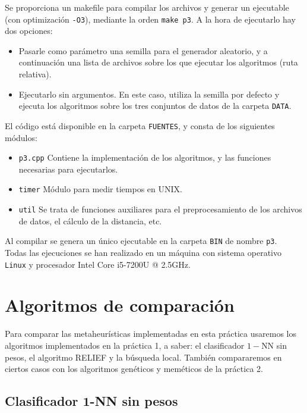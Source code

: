 \documentclass[12pt]{article}
\begin{document}
Se proporciona un makefile para compilar los archivos y generar un ejecutable (con optimización \verb|-O3|), mediante la orden \verb|make p3|. A la hora de ejecutarlo hay dos opciones:

\begin{itemize}
    \item Pasarle como parámetro una semilla para el generador aleatorio, y a continuación una lista de archivos sobre los que ejecutar los algoritmos (ruta relativa).
    \item Ejecutarlo sin argumentos. En este caso, utiliza la semilla por defecto y ejecuta los algoritmos sobre los tres conjuntos de datos de la carpeta \verb|DATA|.
\end{itemize}

El código está disponible en la carpeta \verb|FUENTES|, y consta de los siguientes módulos:

\begin{itemize}
	\item \verb|p3.cpp| Contiene la implementación de los algoritmos, y las funciones necesarias para ejecutarlos.
	\item \verb|timer| Módulo para medir tiempos en UNIX.
	\item \verb|util| Se trata de funciones auxiliares para el preprocesamiento de los archivos de datos, el cálculo de la distancia, etc.
\end{itemize}

Al compilar se genera un único ejecutable en la carpeta \verb|BIN| de nombre \verb|p3|.\\

Todas las ejecuciones se han realizado en un máquina con sistema operativo \verb|Linux| y procesador Intel Core i5-7200U @ 2.5GHz.

\newpage
\section{Algoritmos de comparación}

Para comparar las metaheurísticas implementadas en esta práctica usaremos los algoritmos implementados en la práctica 1, a saber: el clasificador $1-$NN sin pesos, el algoritmo RELIEF y la búsqueda local. También compararemos en ciertos casos con los algoritmos genéticos y meméticos de la práctica 2.

\subsection*{{\color{red} Clasificador $\mathbf{1}$-NN sin pesos}}
\end{document}
